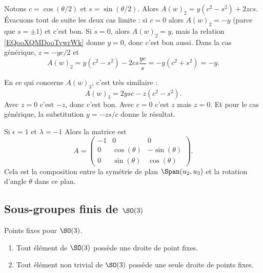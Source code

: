 \begin{subproof}
        Notons \( c=\cos(\theta/2)\) et \( s=\sin(\theta/2)\). Alors \( A(w)_2=y(c^2-s^2)+2zcs\). Évacuons tout de suite les deux cas limite : si \( c=0\) alors \( A(w)_2=-y\) (parce que \( s=\pm1\)) et c'est bon. Si \( s=0\), alors \( A(w)_2=y\), mais la relation \eqref{EQooXQMDooTvwrWk} donne \( y=0\), donc c'est bon aussi. Dans la cas générique, \( z=-yc/2\) et
        \begin{equation}
            A(w)_2=y(c^2-s^2)-2cs\frac{ yc }{ s }=-y(c^2+s^2)=-y.
        \end{equation}

        En ce qui concerne \( A(w)_3\), c'est très similaire :
        \begin{equation}
            A(w)_3=2ysc-z(c^2-s^2).
        \end{equation}
        Avec \( z=0\) c'est \( -z\), donc c'est bon. Avec \( c=0\) c'est \( z\) mais \( z=0\). Et pour le cas générique, la substitution \( y=-zs/c\) donne le résultat.


    \item[Si \( \epsilon=1\) et \( \lambda=-1\)] Alors la matrice est
        \begin{equation}
            A=\begin{pmatrix}
                -1    &   0    &   0    \\
                0    &   \cos(\theta)    &   -\sin(\theta)    \\
                0    &   \sin(\theta)    &   \cos(\theta)
            \end{pmatrix}.
        \end{equation}
        Cela est la composition entre la symétrie de plan \( \Span(u_2,u_3)\) et la rotation d'angle \( \theta\) dans ce plan.
\end{subproof}

\subsection{Sous-groupes finis de \( \SO(3)\)}

\begin{lemma}       \label{LEMooWIMMooXOCfSt}
    Points fixes pour \( \SO(3)\).
    \begin{enumerate}
        \item
            Tout élément de \( \SO(3)\) possède une droite de point fixes.
        \item
            Tout élément non trivial de \( \SO(3)\) possède une seule droite de points fixes.
    \end{enumerate}
\end{lemma}

